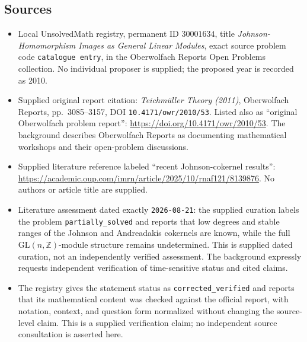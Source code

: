 \documentclass[11pt]{article}
\newcommand{\Z}{\mathbb{Z}}
\begin{document}
\subsection{Sources}
\begin{itemize}
\item Local UnsolvedMath registry, permanent ID \(30001634\), title \emph{Johnson-Homomorphism Images as General Linear Modules}, exact source problem code \texttt{catalogue entry}, in the Oberwolfach Reports Open Problems collection. No individual proposer is supplied; the proposed year is recorded as 2010.
\item Supplied original report citation: \emph{Teichm\"uller Theory (2011)}, Oberwolfach Reports, pp.\ 3085--3157, DOI \texttt{10.4171/owr/2010/53}. Listed also as ``original Oberwolfach problem report'': \url{https://doi.org/10.4171/owr/2010/53}. The background describes Oberwolfach Reports as documenting mathematical workshops and their open-problem discussions.
\item Supplied literature reference labeled ``recent Johnson-cokernel results'': \url{https://academic.oup.com/imrn/article/2025/10/rnaf121/8139876}. No authors or article title are supplied.
\item Literature assessment dated exactly \texttt{2026-08-21}: the supplied curation labels the problem \texttt{partially\_solved} and reports that low degrees and stable ranges of the Johnson and Andreadakis cokernels are known, while the full \(\mathrm{GL}(n,\Z)\)-module structure remains undetermined. This is supplied dated curation, not an independently verified assessment. The background expressly requests independent verification of time-sensitive status and cited claims.
\item The registry gives the statement status as \texttt{corrected\_verified} and reports that its mathematical content was checked against the official report, with notation, context, and question form normalized without changing the source-level claim. This is a supplied verification claim; no independent source consultation is asserted here.
\end{itemize}
\end{document}
